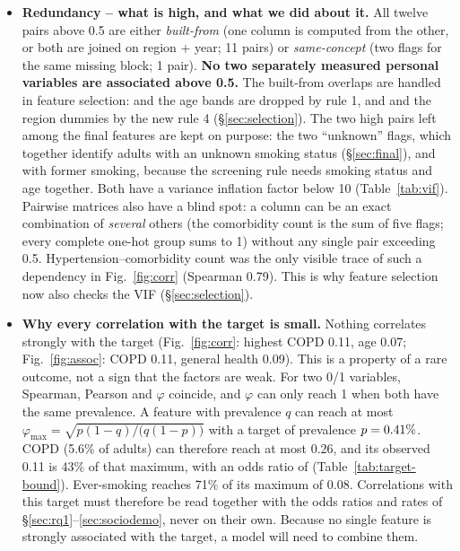 \begin{itemize}
  \item \textbf{Redundancy -- what is high, and what we did about it.} All twelve pairs above 0.5 are either \emph{built-from} (one column is computed from the other, or both are joined on region + year; 11 pairs) or \emph{same-concept} (two flags for the same missing block; 1 pair). \textbf{No two separately measured personal variables are associated above 0.5.} The built-from overlaps are handled in feature selection:  and the age bands are dropped by rule 1, and  and the region dummies by the new rule 4 (\S\ref{sec:selection}). The two high pairs left among the final features are kept on purpose: the two ``unknown'' flags, which together identify adults with an unknown smoking status (\S\ref{sec:final}), and  with former smoking, because the screening rule needs smoking status and age together. Both have a variance inflation factor below 10 (Table~\ref{tab:vif}). Pairwise matrices also have a blind spot: a column can be an exact combination of \emph{several} others (the comorbidity count is the sum of five flags; every complete one-hot group sums to 1) without any single pair exceeding 0.5. Hypertension--comorbidity count was the only visible trace of such a dependency in Fig.~\ref{fig:corr} (Spearman 0.79). This is why feature selection now also checks the VIF (\S\ref{sec:selection}).
  \item \textbf{Why every correlation with the target is small.} Nothing correlates strongly with the target (Fig.~\ref{fig:corr}: highest COPD 0.11, age 0.07; Fig.~\ref{fig:assoc}: COPD 0.11, general health 0.09). This is a property of a rare outcome, not a sign that the factors are weak. For two 0/1 variables, Spearman, Pearson and $\varphi$ coincide, and $\varphi$ can only reach 1 when both have the same prevalence. A feature with prevalence $q$ can reach at most $\varphi_{\max} = \sqrt{p(1-q) / \bigl(q(1-p)\bigr)}$ with a target of prevalence $p = 0.41\%$. COPD (5.6\% of adults) can therefore reach at most 0.26, and its observed 0.11 is 43\% of that maximum, with an odds ratio of \orCOPD (Table~\ref{tab:target-bound}). Ever-smoking reaches 71\% of its maximum of 0.08. Correlations with this target must therefore be read together with the odds ratios and rates of \S\ref{sec:rq1}--\ref{sec:sociodemo}, never on their own. Because no single feature is strongly associated with the target, a model will need to combine them.
\end{itemize}

